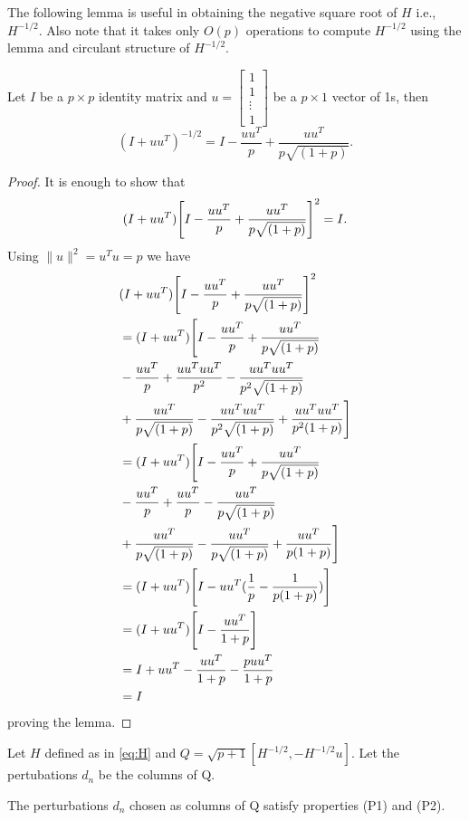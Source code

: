 The following lemma is useful in obtaining the negative square root of $H$ i.e., 
$H^{-1/2}$. Also note that it takes only $O(p)$ operations to compute $H^{-1/2}$
using the lemma and circulant structure of $H^{-1/2}$.
\begin{lemma}
 \label{lemma: gen Sherman-Morisson}
Let $I$ be a $p \times p$ identity matrix and $u = 
\left[
 \begin{array}{cccc}
 1 \\ 1 \\  \vdots \\ 1 
\end{array} \right]$ be a $p \times 1$ vector of 1s, then
$$ (I+uu^T)^{-1/2}= I-\frac{uu^T}{p}+\frac{uu^T}{p\sqrt{(1+p)}}.$$
\end{lemma}
\begin{proof}
It is enough to show that
$$(I+uu^T)\Bigg{[}I-\frac{uu^T}{p}+\frac{uu^T}{p\sqrt{(1+p)}}\Bigg{]}^2=I.$$
Using $\|u\|^2=u^Tu=p$ we have
\begin{align*}
 & (I+uu^T)\Bigg{[}I-\frac{uu^T}{p}+\frac{uu^T}{p\sqrt{(1+p)}}\Bigg{]}^2\\
 &= (I+uu^T)\Bigg{[}I-\frac{uu^T}{p}+\frac{uu^T}{p\sqrt{(1+p)}}\\
 &-\frac{uu^T}{p}+\frac{uu^Tuu^T}{p^2}-\frac{uu^Tuu^T}{p^2\sqrt{(1+p)}}\\
 &+\frac{uu^T}{p\sqrt{(1+p)}}-\frac{uu^Tuu^T}{p^2\sqrt{(1+p)}}+\frac{uu^Tuu^T}{p^2(1+p)}\Bigg{]}\\
 &= (I+uu^T)\Bigg{[}I-\frac{uu^T}{p}+\frac{uu^T}{p\sqrt{(1+p)}}\\
 &-\frac{uu^T}{p}+\frac{uu^T}{p}-\frac{uu^T}{p\sqrt{(1+p)}}\\
 &+\frac{uu^T}{p\sqrt{(1+p)}}-\frac{uu^T}{p\sqrt{(1+p)}}+\frac{uu^T}{p(1+p)}\Bigg{]}\\
 &=(I+uu^T)\Bigg{[}I-uu^T(\frac{1}{p}-\frac{1}{p(1+p)})\Bigg{]}\\
 &=(I+uu^T)\Bigg{[}I-\frac{uu^T}{1+p}\Bigg{]}\\
 &=I+uu^T-\frac{uu^T}{1+p}-\frac{puu^T}{1+p}\\
 &=I
\end{align*}
proving the lemma.
\end{proof}
Let $H$ defined as in \eqref{eq:H} and $Q=\sqrt{p+1}[H^{-1/2},-H^{-1/2}u].$
Let the pertubations $d_n$ be the columns of Q. 
\begin{lemma}
 The perturbations $d_n$ chosen as columns of Q satisfy properties (P1) and (P2).
\end{lemma}
